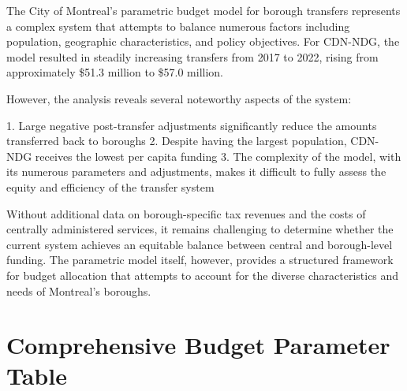 \documentclass{article}
\begin{document}
The City of Montreal's parametric budget model for borough transfers represents a complex system that attempts to balance numerous factors including population, geographic characteristics, and policy objectives. For CDN-NDG, the model resulted in steadily increasing transfers from 2017 to 2022, rising from approximately \$51.3 million to \$57.0 million.

However, the analysis reveals several noteworthy aspects of the system:

1. Large negative post-transfer adjustments significantly reduce the amounts transferred back to boroughs
2. Despite having the largest population, CDN-NDG receives the lowest per capita funding
3. The complexity of the model, with its numerous parameters and adjustments, makes it difficult to fully assess the equity and efficiency of the transfer system

Without additional data on borough-specific tax revenues and the costs of centrally administered services, it remains challenging to determine whether the current system achieves an equitable balance between central and borough-level funding. The parametric model itself, however, provides a structured framework for budget allocation that attempts to account for the diverse characteristics and needs of Montreal's boroughs.

\section{Comprehensive Budget Parameter Table}
\end{document}
